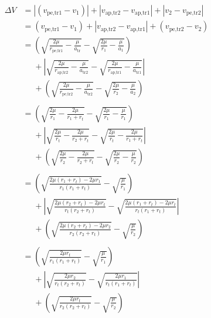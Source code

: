 \documentclass{article}
\begin{document}
\begin{align*}
    \Delta V & = |(v_\text{pe,tr1}-v_1)|+|v_\text{ap,tr2}-v_\text{ap,tr1}|+|v_2-v_\text{pe,tr2}|                                                                   \\
             & = (v_\text{pe,tr1}-v_1)+|v_\text{ap,tr2}-v_\text{ap,tr1}|+(v_\text{pe,tr2}-v_2)                                                                     \\
             & = \left(\sqrt{\frac{2\mu}{r_\text{pe,tr1}}-\frac{\mu}{a_\text{tr}}}-\sqrt{\frac{2\mu}{r_1}-\frac{\mu}{a_1}}\right)                                  \\
             & \phantom{=} +\left|\sqrt{\frac{2\mu}{r_\text{ap,tr2}}-\frac{\mu}{a_\text{tr2}}}-\sqrt{\frac{2\mu}{r_\text{ap,tr1}}-\frac{\mu}{a_\text{tr1}}}\right| \\
             & \phantom{=} +\left(\sqrt{\frac{2\mu}{r_\text{pe,tr2}}-\frac{\mu}{a_\text{tr2}}}-\sqrt{\frac{2\mu}{r_2}-\frac{\mu}{a_2}}\right)                      \\\\
             & = \left(\sqrt{\frac{2\mu}{r_1}-\frac{2\mu}{r_1+r_t}}-\sqrt{\frac{2\mu}{r_1}-\frac{\mu}{r_1}}\right)                                                 \\
             & \phantom{=} +\left|\sqrt{\frac{2\mu}{r_t}-\frac{2\mu}{r_2+r_t}}-\sqrt{\frac{2\mu}{r_t}-\frac{2\mu}{r_1+r_t}}\right|                                 \\
             & \phantom{=} +\left(\sqrt{\frac{2\mu}{r_2}-\frac{2\mu}{r_2+r_t}}-\sqrt{\frac{2\mu}{r_2}-\frac{\mu}{r_2}}\right)                                      \\\\
             & = \left(\sqrt{\frac{2\mu(r_1+r_t)-2\mu r_1}{r_1(r_1+r_t)}}-\sqrt{\frac{\mu}{r_1}}\right)                                                            \\
             & \phantom{=} +\left|\sqrt{\frac{2\mu(r_2+r_t)-2\mu r_t}{r_t(r_2+r_t)}}-\sqrt{\frac{2\mu(r_1+r_t)-2\mu r_t}{r_t(r_1+r_t)}}\right|                     \\
             & \phantom{=} +\left(\sqrt{\frac{2\mu(r_2+r_t)-2\mu r_2}{r_2(r_2+r_t)}}-\sqrt{\frac{\mu}{r_2}}\right)                                                 \\\\
             & = \left(\sqrt{\frac{2\mu r_t}{r_1(r_1+r_t)}}-\sqrt{\frac{\mu}{r_1}}\right)                                                                          \\
             & \phantom{=} +\left|\sqrt{\frac{2\mu r_2}{r_t(r_2+r_t)}}-\sqrt{\frac{2\mu r_1}{r_t(r_1+r_t)}}\right|                                                 \\
             & \phantom{=} +\left(\sqrt{\frac{2\mu r_t}{r_2(r_2+r_t)}}-\sqrt{\frac{\mu}{r_2}}\right)                                                               \\
\end{align*}
\end{document}
